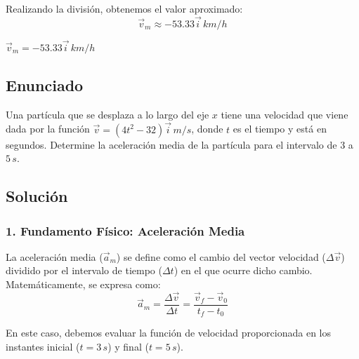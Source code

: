 \documentclass[12pt, a4paper]{article}
\begin{document}
Realizando la división, obtenemos el valor aproximado:
\begin{equation}
    \vec{v}_m \approx -53.33 \vec{i} \, \si{km/h}
\end{equation}

\begin{tcolorbox}[colback=green!5!white, colframe=green!50!black, title=Respuesta Final]
\centering \Large $\vec{v}_m = -53.33 \vec{i} \, \si{km/h}$
\end{tcolorbox}

\newpage

\subsection*{Enunciado}

Una partícula que se desplaza a lo largo del eje $x$ tiene una velocidad que viene dada por la función $\vec{v} = (4t^2 - 32) \vec{i} \, \si{m/s}$, donde $t$ es el tiempo y está en segundos. Determine la aceleración media de la partícula para el intervalo de $3$ a $5 \, \si{s}$.

\begin{center}
\end{center}

\subsection*{Solución}

\subsubsection*{1. Fundamento Físico: Aceleración Media}

La aceleración media ($\vec{a}_m$) se define como el cambio del vector velocidad ($\Delta \vec{v}$) dividido por el intervalo de tiempo ($\Delta t$) en el que ocurre dicho cambio. Matemáticamente, se expresa como:
\begin{equation}
    \vec{a}_m = \frac{\Delta \vec{v}}{\Delta t} = \frac{\vec{v}_f - \vec{v}_0}{t_f - t_0}
\end{equation}

En este caso, debemos evaluar la función de velocidad proporcionada en los instantes inicial ($t = 3 \, \si{s}$) y final ($t = 5 \, \si{s}$).
\end{document}
